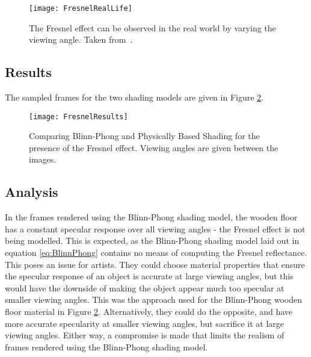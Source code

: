 \begin{figure}[h]
	\centering
	\texttt{[image: FresnelRealLife]}
	\caption{The Fresnel effect can be observed in the real world by varying the viewing angle. Taken from~\cite{MarkusLecture}.}
	\label{fig:FresnelRealLife}
\end{figure}

\subsection{Results}

The sampled frames for the two shading models are given in Figure \ref{fig:FresnelResults}.

\begin{figure}[h]
	\centering
	\texttt{[image: FresnelResults]}
	\caption{Comparing Blinn-Phong and Physically Based Shading for the presence of the Fresnel effect. Viewing angles are given between the images.}
	\label{fig:FresnelResults}
\end{figure}

\subsection{Analysis}

In the frames rendered using the Blinn-Phong shading model, the wooden floor has a constant specular response over all viewing angles - the Fresnel effect is not being modelled. This is expected, as the Blinn-Phong shading model laid out in equation \ref{eq:BlinnPhong} contains no means of computing the Fresnel reflectance. This poses an issue for artists. They could choose material properties that ensure the specular response of an object is accurate at large viewing angles, but this would have the downside of making the object appear much too specular at smaller viewing angles. This was the approach used for the Blinn-Phong wooden floor material in Figure \ref{fig:FresnelResults}. Alternatively, they could do the opposite, and have more accurate specularity at smaller viewing angles, but sacrifice it at large viewing angles. Either way, a compromise is made that limits the realism of frames rendered using the Blinn-Phong shading model.

